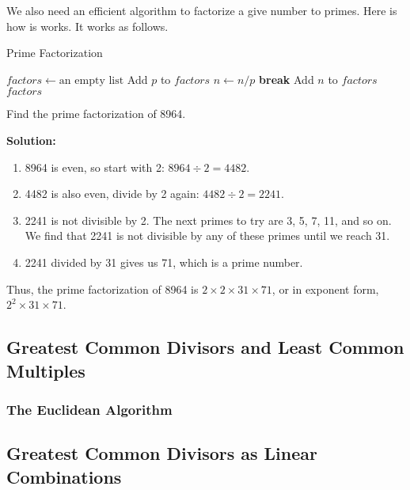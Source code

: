         We also need an efficient algorithm to factorize a give number to primes. Here is how is
        works. It works as follows.
        \begin{algorithm}
            \caption{Prime Factorization}
            \begin{algorithmic}[H]
            
                \State $factors \gets \text{an empty list}$
                        \State Add $p$ to $factors$
                        \State $n \gets n / p$
                    \EndWhile
                        \State \textbf{break}
                    \EndIf
                \EndFor
                    \State Add $n$ to $factors$
                \EndIf
                \State \Return $factors$
            \EndFunction
            
            \end{algorithmic}
            \end{algorithm}
        \begin{example}
            Find the prime factorization of 8964.
        \end{example}
        \textbf{Solution:}

        \begin{enumerate}
            \item 8964 is even, so start with 2: \( 8964 \div 2 = 4482 \).
            \item 4482 is also even, divide by 2 again: \( 4482 \div 2 = 2241 \).
            \item 2241 is not divisible by 2. The next primes to try are 3, 5, 7, 11, and so on. We find that 2241 is not divisible by any of these primes until we reach 31.
            \item 2241 divided by 31 gives us 71, which is a prime number.
        \end{enumerate}
        
        Thus, the prime factorization of 8964 is \( 2 \times 2 \times 31 \times 71 \), or in exponent form, \( 2^2 \times 31 \times 71 \).


    \subsection{Greatest Common Divisors and Least Common Multiples}

    \subsubsection*{The Euclidean Algorithm}

    \subsection{Greatest Common Divisors as Linear Combinations}
